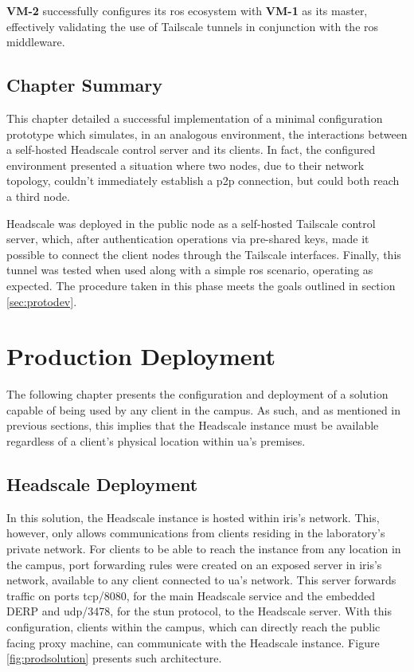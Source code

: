 \documentclass[11pt,twoside,a4paper]{report}
\begin{document}
\textbf{VM-2} successfully configures its \ac{ros} ecosystem with \textbf{VM-1} as its master, effectively validating the use of Tailscale tunnels in conjunction with the \ac{ros} middleware.

\section{Chapter Summary}

This chapter detailed a successful implementation of a minimal configuration prototype which simulates, in an analogous environment, the interactions between a self-hosted Headscale control server and its clients. In fact, the configured environment presented a situation where two nodes, due to their network topology, couldn't immediately establish a \ac{p2p} connection, but could both reach a third node.

Headscale was deployed in the public node as a self-hosted Tailscale control server, which, after authentication operations via pre-shared keys, made it possible to connect the client nodes through the Tailscale interfaces. Finally, this tunnel was tested when used along with a simple \ac{ros} scenario, operating as expected. The procedure taken in this phase meets the goals outlined in section \ref{sec:protodev}.

\chapter{Production Deployment}

The following chapter presents the configuration and deployment of a solution capable of being used by any client in the campus. As such, and as mentioned in previous sections, this implies that the Headscale instance must be available regardless of a client's physical location within \ac{ua}'s premises.

\section{Headscale Deployment}

In this solution, the Headscale instance is hosted within \ac{iris}'s network. This, however, only allows communications from clients residing in the laboratory's private network. For clients to be able to reach the instance from any location in the campus, port forwarding rules were created on an exposed server in \ac{iris}'s network, available to any client connected to \ac{ua}'s network. This server forwards traffic on ports \ac{tcp}/8080, for the main Headscale service and the embedded \ac{DERP} and \ac{udp}/3478, for the \ac{stun} protocol, to the Headscale server. With this configuration, clients within the campus, which can directly reach the public facing proxy machine, can communicate with the Headscale instance. Figure \ref{fig:prodsolution} presents such architecture.
\end{document}
